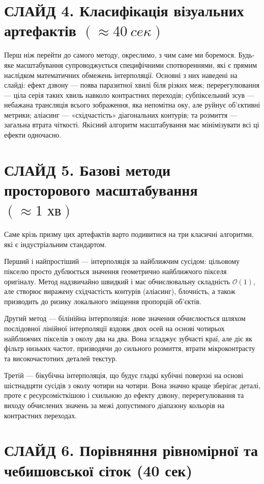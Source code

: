 \documentclass[12pt,a4paper]{article}
\begin{document}
	\section*{СЛАЙД 4. Класифікація візуальних артефактів $(\approx40~ce\kappa)$}
	Перш ніж перейти до самого методу, окреслимо, з чим саме ми боремося. Будь-яке масштабування супроводжується специфічними спотвореннями, які є прямим наслідком математичних обмежень інтерполяції. Основні з них наведені на слайді: ефект дзвону — поява паразитної хвилі біля різких меж; перерегулювання — ціла серія таких хвиль навколо контрастних переходів; субпіксельний зсув — небажана трансляція всього зображення, яка непомітна оку, але руйнує об'єктивні метрики; аліасинг — «східчастість» діагональних контурів; та розмиття — загальна втрата чіткості. Якісний алгоритм масштабування має мінімізувати всі ці ефекти одночасно.
	
	\section*{СЛАЙД 5. Базові методи просторового масштабування $(\approx 1 \text{ хв})$}
	Саме крізь призму цих артефактів варто подивитися на три класичні алгоритми, які є індустріальним стандартом. 
	
	Перший і найпростіший — інтерполяція за найближчим сусідом: цільовому пікселю просто дублюється значення геометрично найближчого пікселя оригіналу. Метод надзвичайно швидкий і має обчислювальну складність $\mathcal{O}(1)$, але створює виражену східчастість контурів (аліасинг), блочність, а також призводить до ризику локального зміщення пропорцій об'єктів.
	
	Другий метод — білінійна інтерполяція: нове значення обчислюється шляхом послідовної лінійної інтерполяції вздовж двох осей на основі чотирьох найближчих пікселів з околу два на два. Вона згладжує зубчасті краї, але діє як фільтр низьких частот, призводячи до сильного розмиття, втрати мікроконтрасту та високочастотних деталей текстур.
	
	Третій — бікубічна інтерполяція, що будує гладкі кубічні поверхні на основі шістнадцяти сусідів з околу чотири на чотири. Вона значно краще зберігає деталі, проте є ресурсомісткішою і схильною до ефекту дзвону, перерегулювання та виходу обчислених значень за межі допустимого діапазону кольорів на контрастних переходах.
	
\section*{СЛАЙД 6. Порівняння рівномірної та чебишовської сіток (40 сек)}
\end{document}
